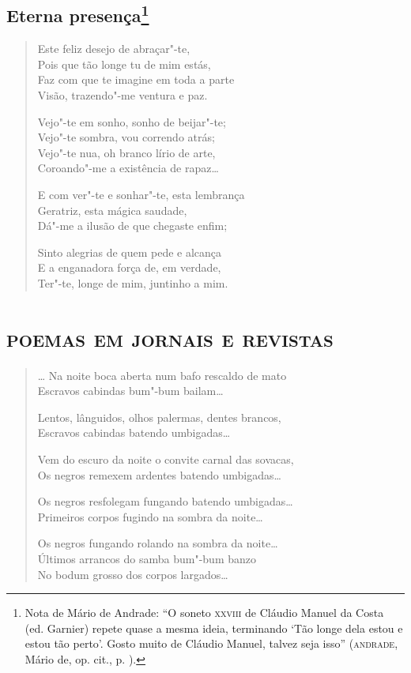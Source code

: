 \chapter{Eterna presença\footnote[*]{Nota de Mário de Andrade: ``O soneto
  \textsc{xxviii} de Cláudio Manuel da Costa (ed. Garnier) repete quase a mesma
  ideia, terminando `Tão longe dela estou e estou tão perto'. Gosto
  muito de Cláudio Manuel, talvez seja isso'' (\textsc{andrade}, Mário de, op.
  cit., p. ).}}

\begin{verse}
Este feliz desejo de abraçar"-te,\\
Pois que tão longe tu de mim estás,\\
Faz com que te imagine em toda a parte\\
Visão, trazendo"-me ventura e paz.

Vejo"-te em sonho, sonho de beijar"-te;\\
Vejo"-te sombra, vou correndo atrás;\\
Vejo"-te nua, oh branco lírio de arte,\\
Coroando"-me a existência de rapaz\ldots{}

E com ver"-te e sonhar"-te, esta lembrança\\
Geratriz, esta mágica saudade,\\
Dá"-me a ilusão de que chegaste enfim;

Sinto alegrias de quem pede e alcança\\
E a enganadora força de, em verdade,\\
Ter"-te, longe de mim, juntinho a mim.
\end{verse}

\part{\textsc{poemas em jornais e revistas}}



\begin{verse}
\ldots{} Na noite boca aberta num bafo rescaldo de mato\\
Escravos cabindas bum"-bum bailam\ldots{}

Lentos, lânguidos, olhos palermas, dentes brancos,\\
Escravos cabindas batendo umbigadas\ldots{}

Vem do escuro da noite o convite carnal das sovacas,\\
Os negros remexem ardentes batendo umbigadas\ldots{}

Os negros resfolegam fungando batendo umbigadas\ldots{}\\
Primeiros corpos fugindo na sombra da noite\ldots{}

Os negros fungando rolando na sombra da noite\ldots{}\\
Últimos arrancos do samba bum"-bum banzo\\
No bodum grosso dos corpos largados\ldots{}
\end{verse}

